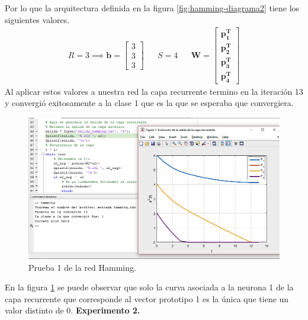 \documentclass[12pt, titlepage]{article}
\begin{document}
        Por lo que la arquitectura definida en la figura \ref{fig:hamming-diagrama2} tiene los siguientes valores.
        \begin{align*}
        R = 3 \implies \boldsymbol{b} = \left[\begin{array}{c}3\\ 3\\ 3\end{array}\right] && S = 4 && \boldsymbol{W} = \left[\begin{array}{c}\boldsymbol{p^{T}_1}\\ \boldsymbol{p^{T}_2}\\ \boldsymbol{p^{T}_3} \\ \boldsymbol{p^{T}_4}\end{array}\right]
        \end{align*}
        Al aplicar estos valores a nuestra red la capa recurrente termino en la iteración 13 y convergió exitosamente a la clase 1 que es la que se esperaba que convergiera.
            \begin{figure}[H]
                \begin{center}
                    \includegraphics[width=16cm]{img/hamming/hamming1.png}
                    \caption{Prueba 1 de la red Hamming.}
                    \label{fig:hamming1}
                \end{center}
            \end{figure}
       En la figura \ref{fig:hamming1} se puede observar que solo la curva asociada a la neurona 1 de la capa recurrente que corresponde al vector prototipo 1 es la única que tiene un valor distinto de 0.
       \newline
       \textbf{Experimento 2.}
\end{document}
